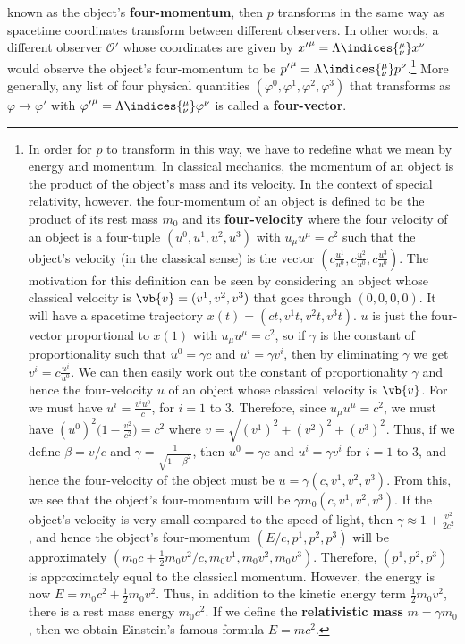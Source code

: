 \documentclass[12pt]{report}
\begin{document}
 known as the object's \textbf{four-momentum}, then $p$ transforms in the same way as spacetime coordinates transform between different observers. In other words, a different observer $\mathcal{O}'$ whose coordinates are given by ${x'}^\mu=\Lambda\indices{^\mu_\nu}x^\nu$ would observe the object's four-momentum to be ${p'}^\mu=\Lambda\indices{^\mu_\nu}p^\nu$.\footnote{\label{srdefivation}In order for $p$ to transform in this way, we have to redefine what we mean by energy and momentum. In classical mechanics, the momentum of an object is the product of the object's mass and its velocity. In the context of special relativity, however, the four-momentum of an object is defined to be the product of its rest mass $m_0$ and its \textbf{four-velocity} where the four velocity of an object is a four-tuple $(u^0, u^1, u^2, u^3)$ with $u_\mu u^\mu=c^2$ such that the object's velocity (in the classical sense) is the vector $(c \frac{u^1}{u^0}, c \frac{u^2}{u^0}, c\frac{u^3}{u^0})$. The motivation for this definition can be seen by considering an object whose classical velocity is $\vb{v}=(v^1,v^2,v^3)$ that goes through $(0,0,0,0)$. It will have a spacetime trajectory $x(t)=(ct, v^1 t, v^2 t, v^3 t)$. $u$ is just the four-vector proportional to $x(1)$ with $u_\mu u^\mu=c^2$, so if $\gamma$ is the constant of proportionality such that $u^0=\gamma c$ and $u^i=\gamma v^i$, then by eliminating $\gamma$ we get $v^i=c\frac{u^i}{u^0}$.  We can then easily work out the constant of proportionality $\gamma$ and hence the
four-velocity $u$ of an object whose classical velocity is $\vb{v}$. For we must have $u^i=\frac{v^i u^0}{c}$, for $i=1$ to $3$. Therefore, since $u_\mu u^\mu=c^2$, we must have $(u^0)^2\big(1-\frac{v^2}{c^2}\big)=c^2$ where $v=\sqrt{({v}^1)^2+({v}^2)^2+({v}^3)^2}$. Thus, if we define $\beta={v}/{c}$ and $\gamma=\frac{1}{\sqrt{1-\beta^2}}$, then $u^0=\gamma c$ and $u^i=\gamma v^i$ for $i=1$ to $3$, and hence the four-velocity of the object must be $u=\gamma(c,v^1,v^2,v^3).$ From this, we see that the object's four-momentum will be $\gamma m_0(c,v^1,v^2,v^3).$ If the object's velocity is very small compared to the speed of light, then $\gamma\approx 1+\frac{v^2}{2c^2}$, and hence the object's four-momentum $(E/c, p^1, p^2, p^3)$ will be approximately $(m_0c+\frac{1}{2}m_0{v^2}/c, m_0v^1,m_0v^2,m_0v^3)$. Therefore, $(p^1, p^2, p^3)$ is approximately equal to the classical momentum. However, the energy is now $E=m_0c^2+\frac{1}{2}m_0{v^2}$. Thus, in addition to the kinetic energy term $\frac{1}{2}m_0{v^2}$, there is a rest mass energy $m_0c^2$. If we define the \textbf{relativistic mass} $m=\gamma m_0$, then we obtain Einstein's famous formula $E=mc^2$.  } More generally, any list of four physical quantities $(\varphi^0, \varphi^1, \varphi^2, \varphi^3)$ that transforms as $\varphi\rightarrow\varphi'$ with  ${\varphi'}^\mu=\Lambda\indices{^\mu_\nu}\varphi^\nu$ is called a \textbf{four-vector}.   
\end{document}

